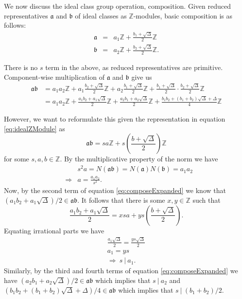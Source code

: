 \documentclass{ucalgthes1}
\theoremstyle{plain}
\theoremstyle{definition}
\newcommand{\ZZ}{\mathbb{Z}}
\begin{document}
We now discuss the ideal class group operation, composition.  Given reduced representatives $\mathfrak{a}$ and $\mathfrak{b}$ of ideal classes as $\ZZ$-modules, basic composition is as follows:
\begin{eqnarray*}
	\mathfrak{a} & = & a_1 \ZZ + \frac{b_1 + \sqrt{\Delta}}{2} \ZZ \\
	\mathfrak{b} & = & a_2 \ZZ + \frac{b_2 + \sqrt{\Delta}}{2} \ZZ.
\end{eqnarray*}

\noindent
There is no $s$ term in the above, as reduced representatives are primitive.  Component-wise multiplication of $\mathfrak a$ and $\mathfrak b$ give us
\begin{equation}
\begin{split}
	\mathfrak{a} \mathfrak{b} & = a_1a_2 \ZZ + a_1 \frac{b_2 + \sqrt{\Delta}}{2} \ZZ + a_2 \frac{b_1 + \sqrt{\Delta}}{2} \ZZ + \frac{b_1 + \sqrt{\Delta}}{2} \cdot \frac{b_2 + \sqrt{\Delta}}{2} \ZZ \\
	& = a_1a_2 \ZZ + \frac{a_1b_2 + a_1\sqrt{\Delta}}{2} \ZZ + \frac{a_2b_1 + a_2\sqrt{\Delta}}{2} \ZZ + \frac{b_1b_2 + (b_1+b_2)\sqrt{\Delta} + \Delta}{4} \ZZ \label{eq:composeExpanded}
\end{split}
\end{equation}

\noindent
However, we want to reformulate this given the representation in equation \eqref{eq:idealZModule} as
\[
	\mathfrak{a} \mathfrak{b} = sa \ZZ + s \left(\frac{b + \sqrt{\Delta}}{2}\right) \ZZ
\]
for some $s, a, b \in \ZZ$.  By the multiplicative property of the norm we have
\begin{eqnarray*}
	&& s^2a = N(\mathfrak{a}\mathfrak{b}) = N(\mathfrak{a})N(\mathfrak{b}) = a_1 a_2 \\
	& \Rightarrow & a = \frac{a_1a_2}{s^2}.
\end{eqnarray*}
Now, by the second term of equation \eqref{eq:composeExpanded} we know that $(a_1b_2 + a_1\sqrt{\Delta})/2 \in \mathfrak{a}\mathfrak{b}$.  It follows that there is some $x,y \in \ZZ$ such that
\[
	\frac{a_1b_2 + a_1\sqrt{\Delta}}{2} = xsa + ys\left(\frac{b+\sqrt{\Delta}}{2}\right).
\]
Equating irrational parts we have
\begin{gather*}
	\frac{a_1\sqrt{\Delta}}{2} = \frac{ys\sqrt{\Delta}}{2} \\
	a_1 = ys \\
	\Rightarrow~ s~|~a_1.
\end{gather*}
\noindent
Similarly, by the third and fourth terms of equation \eqref{eq:composeExpanded} we have $(a_2b_1+a_2\sqrt{\Delta})/2 \in \mathfrak{a}\mathfrak{b}$ which implies that $s~|~a_2$ and $(b_1b_2 + (b_1+b_2)\sqrt{\Delta} + \Delta)/4 \in \mathfrak{a}\mathfrak{b}$ which implies that \break $s~|~(b_1+b_2)/2$. 
\end{document}

